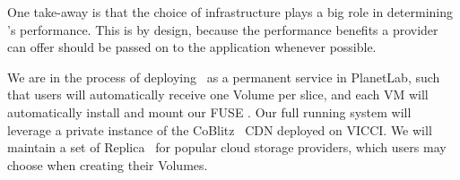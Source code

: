 One take-away is that the choice of infrastructure plays a big role
in determining \Syndicate's performance.  This is by design, because
the performance benefits a provider can offer should be passed on to
the application whenever possible.

We are in the process of deploying \Syndicate\ as a permanent service
in PlanetLab, such that users will automatically receive one Volume per
slice, and each VM will automatically install and mount our FUSE \SG.
Our full running system will leverage a private
instance of the CoBlitz~\cite{coblitz} CDN deployed on VICCI.  We will
maintain a set of Replica \SGs\ for
popular cloud storage providers, which users may choose when creating
their Volumes.

